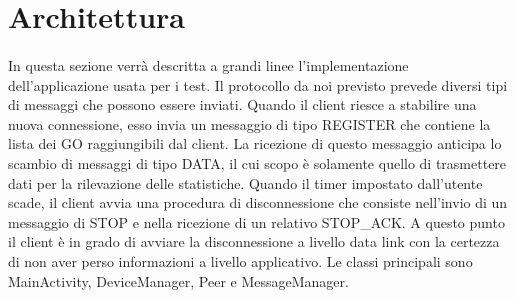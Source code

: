 \documentclass{llncs}
\begin{document}


\section{Architettura}

\paragraph{} In questa sezione verrà descritta a grandi linee l'implementazione dell'applicazione usata per i test. Il protocollo da noi previsto prevede diversi tipi di messaggi che possono essere inviati. Quando il client 
riesce a stabilire una nuova connessione, esso invia un messaggio di tipo REGISTER che contiene la lista dei GO raggiungibili dal client. La ricezione di questo messaggio anticipa lo scambio di messaggi di tipo DATA, il cui scopo
è solamente quello di trasmettere dati per la rilevazione delle statistiche. Quando il timer impostato dall'utente scade, il client avvia una procedura di disconnessione che consiste nell'invio di un messaggio di STOP e nella ricezione 
di un relativo STOP\_ACK. A questo punto il client è in grado di avviare la disconnessione a livello data link con la certezza di non aver perso informazioni a livello applicativo.
Le classi principali sono MainActivity, DeviceManager, Peer e MessageManager.
\end{document}
